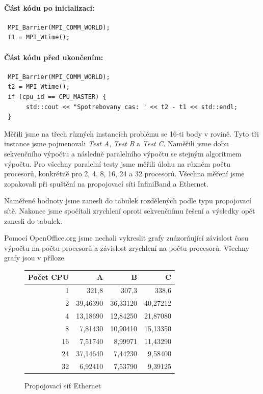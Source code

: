 \documentclass[12pt]{article}
\begin{document}
\paragraph{Část kódu po inicializaci:}
\begin{verbatim}
 MPI_Barrier(MPI_COMM_WORLD);
 t1 = MPI_Wtime();
\end{verbatim}
\paragraph{Část kódu před ukončením:}
\begin{verbatim}
 MPI_Barrier(MPI_COMM_WORLD);
 t2 = MPI_Wtime();
 if (cpu_id == CPU_MASTER) {
      std::cout << "Spotrebovany cas: " << t2 - t1 << std::endl;
 }
\end{verbatim}

Měřili jsme na třech různých instancích problému se 16-ti body v rovině. Tyto tři instance jsme
pojmenovali \emph{Test A}, \emph{Test B} a \emph{Test C}. Naměřili jsme dobu sekvenčního výpočtu
a následně paralelního výpočtu se stejným algoritmem výpočtu. Pro všechny paralelní testy jsme měřili úlohu na
různém počtu procesorů, konkrétně pro 2, 4, 8, 16, 24 a 32 procesorů. Všechna měření jsme zopakovali
při spuštění na propojovací síti InfiniBand a Ethernet.

Naměřené hodnoty jsme zanesli do tabulek rozdělených podle typu propojovací sítě. Nakonec jsme spočítali
zrychlení oproti sekvenčnímu řešení a výsledky opět zanesli do tabulek.

Pomocí OpenOffice.org jsme nechali vykreslit grafy znázorňující závislost času výpočtu na počtu procesorů
a závislost zrychlení na počtu procesorů. Všechny grafy jsou v příloze.

\begin{figure}[h]
\caption{Propojovací síť Ethernet}
\begin{center}
\begin{tabular}{|r|r|r|r|}
\hline
Počet CPU & A & B & C\\
\hline
1 & 321,8 & 307,3 & 338,6\\
\hline
2 & 39,46390 & 36,33120 & 40,27212\\
\hline
4 & 13,18690 & 12,84250 & 21,87080\\
\hline
8 & 7,81430 & 10,90410 & 15,13350\\
\hline
16 & 7,51740 & 8,99971 & 11,43290\\
\hline
24 & 37,14640 & 7,44230 & 9,58400\\
\hline
32 & 6,92410 & 7,53790 & 9,39125\\
\hline
\end{tabular}
\end{center}
\end{figure}
\end{document}
